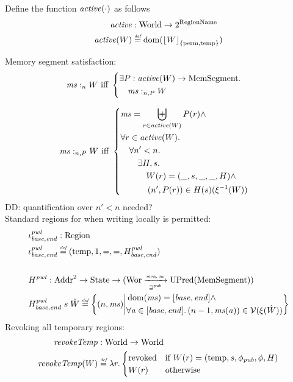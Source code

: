 \documentclass[a4paper]{article}
\DeclarePairedDelimiter\floor{\lfloor}{\rfloor}
\newcommand{\fun}{\rightarrow}
\newcommand{\defeq}{\stackrel{\textit{\tiny{def}}}{=}}
\DeclareMathOperator{\dom}{dom}
\newcommand\dominique[1]{{\color{purple} \sf \footnotesize {DD: #1}}\\}
\newcommand{\var}[1]{\mathit{#1}}
\newcommand{\hs}{\var{ms}}
\newcommand{\ms}{\hs}
\newcommand{\addr}{\var{a}}
\newcommand{\start}{\var{base}}
\newcommand{\addrend}{\var{end}}
\newcommand{\heap}{\var{mem}}
\newcommand{\pwl}{\var{pwl}}
\newcommand{\plainfun}[2]{
  \ifthenelse{\equal{#2}{}}
  {\mathit{#1}}
  {\mathit{#1}(#2)}
}
\newcommand{\revokeTemp}[1]{\plainfun{revokeTemp}{#1}}
\newcommand{\erase}[2]{\floor*{#1}_{\{#2\}}}
\newcommand{\activeReg}[1]{\plainfun{active}{#1}}
\newcommand{\pub}{\var{pub}}
\newcommand{\futurewk}{\mathbin{\sqsupseteq}^{\var{pub}}}
\newcommand{\heapSat}[3][\heap]{#1 :_{#2} #3}
\newcommand{\memSatPar}[4][n]{\heapSat[#2]{#1 , #4}{#3}}
\newcommand{\monwknefun}{\xrightarrow[\text{\tiny{$\futurewk$}}]{\textit{\tiny{mon, ne}}}}
\newcommand{\asmType}{\plaindom{AsmType}}
\newcommand{\plaindom}[1]{\mathrm{#1}}
\newcommand{\Addrs}{\plaindom{Addr}}
\newcommand{\HeapSegments}{\plaindom{MemSegment}}
\newcommand{\States}{\plaindom{State}}
\newcommand{\RegionNames}{\plaindom{RegionName}}
\newcommand{\Regions}{\plaindom{Region}}
\newcommand{\Worlds}{\plaindom{World}}
\newcommand{\Wor}{\plaindom{Wor}}
\newcommand{\UPred}[1]{\plaindom{UPred}(#1)}
\newcommand{\intr}[2]{\mathcal{#1}}
\newcommand{\valueintr}[1]{\intr{V}{#1}}
\newcommand{\stdvr}{\valueintr{\asmType}}
\newcommand{\npair}[2][n]{\left(#1,#2 \right)}
\newcommand{\plainview}[1]{\mathrm{#1}}
\newcommand{\perma}{\plainview{perm}}
\newcommand{\temp}{\plainview{temp}}
\newcommand{\revoked}{\plainview{revoked}}
\begin{document}
Define the function $\activeReg{\cdot}$ as follows
\begin{align*}
  \activeReg{} & : \Worlds \fun 2^\RegionNames \\
  \activeReg{W} & \defeq \dom(\erase{W}{\perma,\temp})
\end{align*}


Memory segment satisfaction:
\begin{align*}
  &\heapSat[\hs]{n}{W} 
    \text{ iff }
    \left\{\begin{aligned}
        &\exists P : \activeReg{W} \rightarrow \HeapSegments \ldotp \\
        &\quad \memSatPar{\ms}{W}{P}
      \end{aligned}\right.
\end{align*}

\begin{align*}
  &\memSatPar{\ms}{W}{P}
    \text{ iff }
    \left\{\begin{aligned}
        &\hs = \biguplus_{r\in\activeReg{W}}P(r) \land \\
        &\forall r \in \activeReg{W} \ldotp\\
        &\quad  \forall n'<n \ldotp \\
        &\qquad \exists H,s \ldotp\\
        &\qquad \quad W(r) = (\_,s,\_,\_,H) \land \\
        &\qquad \quad \npair[n']{P(r)} \in H(s)(\xi^{-1}(W))\\
      \end{aligned}\right.
\end{align*}
\dominique{quantification over $n' < n$ needed?}

Standard regions for when writing locally is permitted:
\begin{align*}
  &\iota_{\start,\addrend}^\pwl : \Regions\\
  &\iota_{\start,\addrend}^\pwl \defeq (\temp,1,=,=,H^\pwl_{\start,\addrend}) \\
  \\
  &H^\pwl : \Addrs^2 \fun \States \fun (\Wor \monwknefun \UPred{\HeapSegments})\\
  &H^\pwl_{\start,\addrend}\; s \; \hat{W} \defeq \left\{\npair{\hs} \middle|
    \begin{aligned}
      &\dom(\hs) = [\start,\addrend] \land \\
      &\forall \addr \in [\start,\addrend] \ldotp \npair[n-1]{\hs(\addr)} \in \stdvr(\xi(\hat{W}))
    \end{aligned}
        \right\}
\end{align*}
Revoking all temporary regions:
\begin{align*}
  \revokeTemp{} & : \Worlds \fun \Worlds \\
  \revokeTemp{W} & \defeq \lambda r \ldotp 
                   \begin{cases}
                     \revoked            & \text{if }W(r) = (\temp,s,\phi_\pub,\phi,H) \\
                     W(r)                & \text{otherwise}
                   \end{cases}
\end{align*}
\newcommand{\wrev}[1]{\revokeTemp{#1}}
\end{document}
